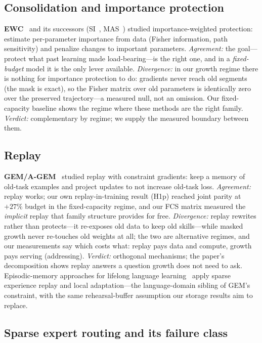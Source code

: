 \documentclass[11pt]{article}
\theoremstyle{definition}\newtheorem{definition}{Definition}
\theoremstyle{remark}\newtheorem{remark}{Remark}
\begin{document}
\subsection{Consolidation and importance protection}
\label{sec:prior:consolidation}

\textbf{EWC}~\cite{ewc} and its successors (SI~\cite{si}, MAS~\cite{mas}) studied
importance-weighted protection: estimate per-parameter importance from data (Fisher
information, path sensitivity) and penalize changes to important parameters. \emph{Agreement:}
the goal---protect what past learning made load-bearing---is the right one, and in a
\emph{fixed-budget} model it is the only lever available. \emph{Divergence:} in our growth
regime there is nothing for importance protection to do: gradients never reach old
segments (the mask is exact), so the Fisher matrix over old parameters is identically zero
over the preserved trajectory---a measured null, not an omission. Our fixed-capacity
baseline shows the regime where these methods are the right family. \emph{Verdict:}
complementary by regime; we supply the measured boundary between them.

\subsection{Replay}
\label{sec:prior:replay}

\textbf{GEM/A-GEM}~\cite{gem,agem} studied replay with constraint gradients: keep a
memory of old-task examples and project updates to not increase old-task loss.
\emph{Agreement:} replay works; our own replay-in-training result (H1p) reached joint
parity at $+27\%$ budget in the fixed-capacity regime, and our FCS matrix measured the
\emph{implicit} replay that family structure provides for free. \emph{Divergence:} replay
rewrites rather than protects---it re-exposes old data to keep old skills---while masked
growth never re-touches old weights at all; the two are alternative regimes, and our
measurements say which costs what: replay pays data and compute, growth pays serving
(addressing). \emph{Verdict:} orthogonal mechanisms; the paper's decomposition shows
replay answers a question growth does not need to ask. Episodic-memory approaches for lifelong language learning~\cite{multilingual-cl} apply sparse experience replay and local adaptation---the language-domain sibling of GEM's constraint, with the same rehearsal-buffer assumption our storage results aim to replace.

\subsection{Sparse expert routing and its failure class}
\label{sec:prior:moe}
\end{document}
